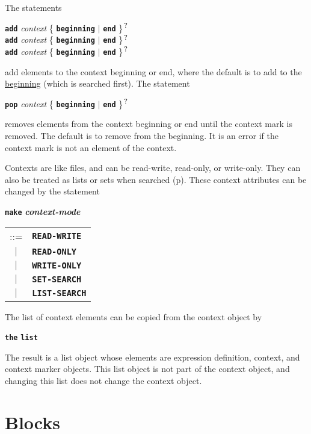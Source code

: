 \documentclass[12pt]{article}
\newcommand{\TT}[1]{{\tt \bfseries #1}}
\newcommand{\ttkey}[1]{{\tt \bfseries #1}}
\newcommand{\emkey}[1]{{\em \bfseries #1}}
\newcommand{\pagref}[1]{p\pageref{#1}}
\newcommand{\QMARK}{{$^{\,\mbox{\footnotesize ?}}$}}
\newenvironment{indpar}[1][0.3in]%
	{\begin{list}{}%
		     {\setlength{\itemsep}{0in}%
		      \setlength{\topsep}{0in}%
		      \setlength{\parsep}{1ex}%
		      \setlength{\labelwidth}{#1}%
		      \setlength{\leftmargin}{#1}%
		      \addtolength{\leftmargin}{\labelsep}}%
	 \item}%
	{\end{list}}
\begin{document}
The statements
\begin{indpar}
\ttkey{add}
    {\em context} \{ \TT{beginning} $|$ \TT{end} \}\QMARK{} \\
\ttkey{add}
    {\em context} \{ \TT{beginning} $|$ \TT{end} \}\QMARK{} \\
\ttkey{add}
    {\em context} \{ \TT{beginning} $|$ \TT{end} \}\QMARK{}
\end{indpar}
add elements to the context beginning or end, where the
default is to add to the \underline{beginning} (which is searched first).
The statement
\begin{indpar}
\ttkey{pop}
    {\em context} \{ \TT{beginning} $|$ \TT{end} \}\QMARK{}
\end{indpar}
removes elements from the context beginning or end until the
context mark is removed.  The default is to remove from the beginning.
It is an error if the context mark is not an element of the context.

Contexts are like files, and can be read-write, read-only, or
write-only.  They can also be treated as lists or sets when
searched (\pagref{CONTEXT-MODE}).  These context attributes
can be changed by the statement
\begin{indpar}
\ttkey{make}
\emkey{context-mode} \begin{tabular}[t]{@{}cl}
                     ::= & \ttkey{READ-WRITE} \\
                     $|$ & \ttkey{READ-ONLY} \\
                     $|$ & \ttkey{WRITE-ONLY} \\
                     $|$ & \ttkey{SET-SEARCH} \\
                     $|$ & \ttkey{LIST-SEARCH} \\
		     \end{tabular}
\end{indpar}



The list of context elements
can be copied from the context object by

\begin{indpar}
\TT{the} \ttkey{list}
\end{indpar}

The result is a list object whose elements are expression definition,
context, and context marker objects.  This list object is not
part of the context object, and changing this list does not change
the context object.

\section{Blocks}
\label{BLOCKS}
\end{document}
